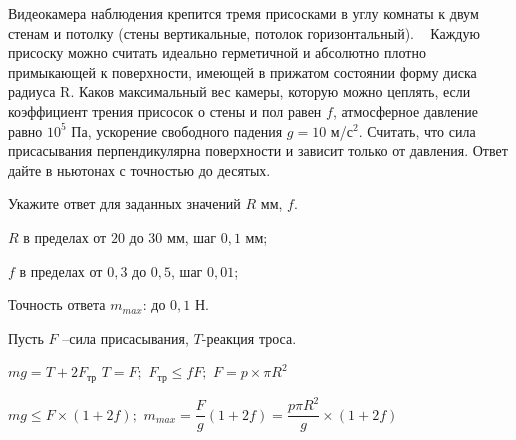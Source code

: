 Видеокамера наблюдения крепится тремя присосками в углу
комнаты к двум стенам и потолку (стены вертикальные, потолок горизонтальный).   Каждую
присоску можно считать идеально герметичной и абсолютно плотно примыкающей к поверхности,
имеющей в прижатом состоянии форму диска радиуса R. Каков
максимальный вес камеры, которую можно цеплять, если коэффициент трения
присосок о стены и пол равен $f$, атмосферное
давление равно $10^5$ Па, ускорение свободного падения $g = 10$ м/с$^2$. Считать, что
сила присасывания перпендикулярна поверхности и зависит только от давления. Ответ дайте в ньютонах с точностью до десятых.

Укажите ответ для заданных значений $R$ мм, $f$.

\paramSection

$R$  в пределах от $20$ до $30$ мм, шаг $0,1$ мм;

$f$ в пределах от $0,3$ до $0,5$, шаг $0,01$;

Точность ответа $m_{max}$: до $0,1$ Н.

\solutionSection

Пусть $F$ –сила присасывания, $T$-реакция троса.

$mg=T+2F_{\text{тр}}$     $T=F;$     $ F_{\text{тр}} \leq fF;$   $F=p \times \pi R^2$  

$mg \leq F \times (1+2f);$     $m_{max}=\dfrac{F}{g}(1+2f)=\dfrac{p\pi R^2}{g} \times (1+2f)$

